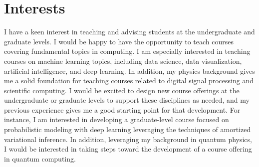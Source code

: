 \documentclass[nobib]{tufte-handout}
\begin{document}
\section{Interests}
I have a keen interest in teaching and advising students at the undergraduate and graduate levels. I would be happy to have the opportunity to teach courses covering fundamental topics in computing. I am especially interested in teaching courses on machine learning topics, including data science, data visualization, artificial intelligence, and deep learning. In addition, my physics background gives me a solid foundation for teaching courses related to digital signal processing and scientific computing. I would be excited to design new course offerings at the undergraduate or graduate levels to support these disciplines as needed, and my previous experience gives me a good starting point for that development. For instance, I am interested in developing a graduate-level course focused on probabilistic modeling with deep learning leveraging the techniques of amortized variational inference. In addition, leveraging my background in quantum physics, I would be interested in taking steps toward the development of a course offering in quantum computing.




\nobibliography{}
\end{document}
